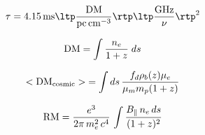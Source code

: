 \documentclass[12pt,letterpaper]{article}
\begin{document}
{\Large

\begin{equation}
\tau = 4.15 \, {\rm ms} \ltp \frac{{\rm DM}}{\rm pc \, cm^{-3}} \rtp
                        \ltp \frac{{\rm GHz}}{\nu} \rtp^2
\end{equation}

\begin{equation}
{\rm DM} = \int \frac{n_e}{1+z} \; ds
\end{equation}

\begin{equation}
<{\rm DM}_{\rm cosmic}> \; = \int ds \, \frac{f_d \rho_b(z) \mu_e}{\mu_m m_p (1+z)}
\end{equation}

\begin{equation}
{\rm RM} = \frac{e^3}{2 \pi \, m_e^2 \, c^4} \, \int \frac{B_\parallel \, n_e \, ds}{(1+z)^2}
\end{equation}


}
\end{document}
